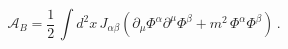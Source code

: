 \begin{equation}\label{actionbulk}
\mathcal{A}_B=\frac{1}{2} \, \int d^{2}x\, J_{\alpha \beta}\left(
\partial_{\mu}\Phi^{\alpha}
\partial^{\mu}\Phi^{\beta}+m^2\,
\Phi^{\alpha}\Phi^{\beta}\right)\, .
\end{equation}

